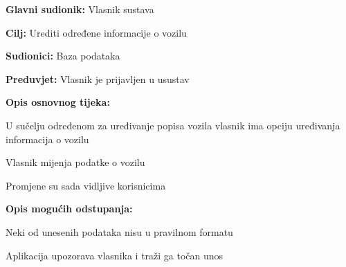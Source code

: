 					\noindent {}
					\begin{packed_item}
	
						\item \textbf{Glavni sudionik: }Vlasnik sustava
						\item  \textbf{Cilj: }Urediti određene informacije o vozilu
						\item  \textbf{Sudionici: }Baza podataka
						\item  \textbf{Preduvjet: }Vlasnik je prijavljen u usustav
						\item  \textbf{Opis osnovnog tijeka:}
						
						\item[] \begin{packed_enum}
							\item U sučelju određenom za uređivanje popisa vozila vlasnik ima opciju uređivanja informacija o vozilu
							\item Vlasnik mijenja podatke o vozilu
							\item Promjene su sada vidljive korisnicima 
						\end{packed_enum}
						
						\item  \textbf{Opis mogućih odstupanja: }
						
						\item[] \begin{packed_item}
	
							\item[2.a] Neki od unesenih podataka nisu u pravilnom formatu
							\item[] \begin{packed_enum}
								\item Aplikacija upozorava vlasnika i traži ga točan unos
							\end{packed_enum}
						\end{packed_item}
					\end{packed_item}
					
